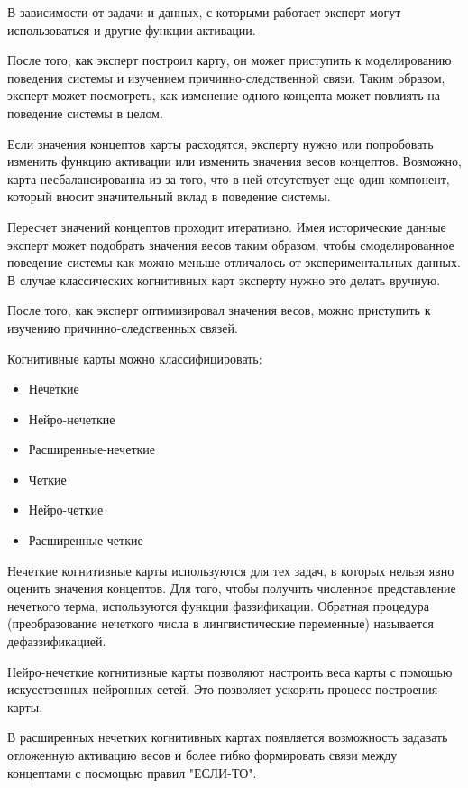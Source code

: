 В зависимости от задачи и данных, с которыми работает эксперт могут использоваться и другие
функции активации.

После того, как эксперт построил карту, он может приступить к моделированию поведения
системы и изучением причинно-следственной связи. Таким образом, эксперт может посмотреть,
как изменение одного концепта может повлиять на поведение системы в целом.

Если значения концептов карты расходятся, эксперту нужно или попробовать изменить функцию
активации или изменить значения весов концептов. Возможно, карта несбалансированна из-за
того, что в ней отсутствует еще один компонент, который вносит значительный вклад в поведение системы.

Пересчет значений концептов проходит итеративно. Имея исторические данные эксперт может
подобрать значения весов таким образом, чтобы смоделированное поведение системы как можно меньше отличалось
от экспериментальных данных. В случае классических когнитивных карт эксперту нужно это делать вручную.

После того, как эксперт оптимизировал значения весов, можно приступить к изучению причинно-следственных
связей.

Когнитивные карты можно классифицировать:

\begin{itemize}
	\item Нечеткие
	\item Нейро-нечеткие
	\item Расширенные-нечеткие
	\item Четкие
	\item Нейро-четкие
	\item Расширенные четкие
\end{itemize}

Нечеткие когнитивные карты используются для тех задач, в которых
нельзя явно оценить значения концептов. Для того, чтобы получить
численное представление нечеткого терма, используются функции фаззификации.
Обратная процедура (преобразование нечеткого числа в лингвистические переменные)
называется дефаззификацией.

Нейро-нечеткие когнитивные карты позволяют настроить веса карты
с помощью искусственных нейронных сетей. Это позволяет ускорить процесс построения карты.

В расширенных нечетких когнитивных картах появляется возможность
задавать отложенную активацию весов и более гибко формировать
связи между концептами с посмощью правил "ЕСЛИ-ТО".

